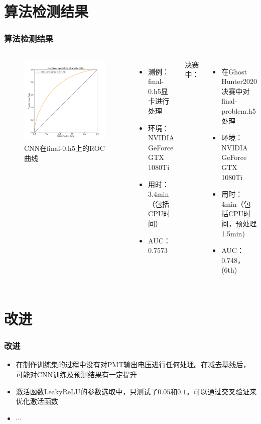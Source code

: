 \documentclass{beamer}
\begin{document}
\section{算法检测结果}
\begin{frame}
\frametitle{算法检测结果}
\begin{columns}
\begin{figure}[H]
    \centering
    \includegraphics[width=1.0\linewidth]{ROC.png}
    \caption{CNN在final-0.h5上的ROC曲线}
\end{figure}
\begin{itemize}
    \item 测例：final-0.h5显卡进行处理
    \item 环境：NVIDIA GeForce GTX 1080Ti
    \item 用时：3.4min（包括CPU时间）
    \item AUC：0.7573
\end{itemize}
决赛中：
\begin{itemize}
    \item 在Ghost Hunter2020决赛中对final-problem.h5处理
    \item 环境：NVIDIA GeForce GTX 1080Ti
    \item 用时：4min（包括CPU时间，预处理1.5min)
    \item AUC：0.748，(6th)
\end{itemize}
\end{columns}
\end{frame}

\section{改进}
\begin{frame}
\frametitle{改进}
\begin{itemize}
    \item 在制作训练集的过程中没有对PMT输出电压进行任何处理。在减去基线后，可能对CNN训练及预测结果有一定提升
    \item 激活函数LeakyReLU的参数选取中，只测试了$0.05$和$0.1$。可以通过交叉验证来优化激活函数
    \item $\cdots$
\end{itemize}
\end{frame}
\end{document}
